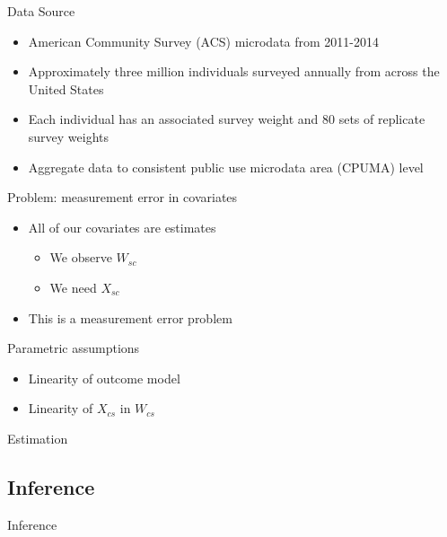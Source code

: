 \documentclass[hyperref={pdfpagelabels=false}]{beamer}
\begin{document}
\begin{frame}{Data Source}
    \begin{itemize}
    \item American Community Survey (ACS) microdata from 2011-2014 \bigskip 
    \item Approximately three million individuals surveyed annually from across the United States \bigskip 
    \item Each individual has an associated survey weight and 80 sets of replicate survey weights \bigskip 
    \item Aggregate data to consistent public use microdata area (CPUMA) level
    \end{itemize}
\end{frame}   

\begin{frame}{Problem: measurement error in covariates}
    \begin{itemize}
        \item All of our covariates are estimates \bigskip
        \begin{itemize}
            \item We observe $W_{sc}$ \bigskip
            \item We need $X_{sc}$ \bigskip
        \end{itemize}
        \item This is a measurement error problem
    \end{itemize}
\end{frame}

\begin{frame}{Parametric assumptions}
    \begin{itemize}
        \item Linearity of outcome model \bigskip
        \item Linearity of $X_{cs}$ in $W_{cs}$ 
    \end{itemize}
\end{frame}

\begin{frame}{Estimation}

\end{frame}

\subsection{Inference}

\begin{frame}{Inference}

\end{frame}
\end{document}
